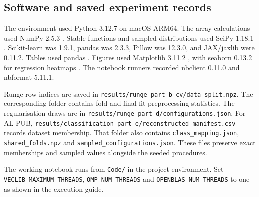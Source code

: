 \subsection{Software and saved experiment records}
The environment used Python 3.12.7 on macOS ARM64. The array calculations used NumPy 2.5.3 \parencite{harris2020numpy}.
Stable functions and sampled distributions used SciPy 1.18.1
\parencite{virtanen2020scipy}. Scikit-learn was 1.9.1, pandas was
2.3.3, Pillow was 12.3.0, and JAX/jaxlib were 0.11.2.
Tables used pandas \parencite{mckinney2010pandas}. Figures used
Matplotlib 3.11.2 \parencite{hunter2007matplotlib}, with seaborn 0.13.2
for regression heatmaps \parencite{waskom2021seaborn}.
The notebook runners recorded nbclient 0.11.0 and nbformat 5.11.1.

Runge row indices are saved in
\nolinkurl{results/runge_part_b_cv/data_split.npz}. The corresponding
folder contains fold and final-fit preprocessing statistics. The
regularisation draws are in
\nolinkurl{results/runge_part_d/configurations.json}.
For AL-PUB, \nolinkurl{results/classification_part_e/reconstructed_manifest.csv}
records dataset membership. That folder also contains
\nolinkurl{class_mapping.json}, \nolinkurl{shared_folds.npz} and
\nolinkurl{sampled_configurations.json}. These files preserve exact
memberships and sampled values alongside the seeded procedures.


The working notebook runs from \nolinkurl{Code/} in the project environment.
Set \nolinkurl{VECLIB_MAXIMUM_THREADS}, \nolinkurl{OMP_NUM_THREADS} and
\nolinkurl{OPENBLAS_NUM_THREADS} to one as shown in the execution guide.

